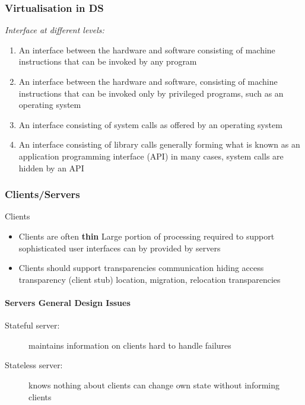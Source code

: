 \subsubsection{Virtualisation in DS}
\textit{Interface at different levels:}
\begin{enumerate}
	\item An interface between the hardware and software consisting of machine instructions
	\subitem that can be invoked by any program
	\item An interface between the hardware and software, consisting of machine instructions
	\subitem that can be invoked only by privileged programs, such as an operating system
	\item An interface consisting of system calls as offered by an operating system
	\item An interface consisting of library calls
	\subitem generally forming what is known as an application programming interface (API)
	\subitem in many cases, system calls are hidden by an API
\end{enumerate}

\subsubsection{Clients/Servers}
\begin{note}{Clients}
	\begin{itemize}
		\item Clients are often \textbf{thin}
		\subitem Large portion of processing required to support sophisticated user interfaces can by provided by servers	
		\item Clients should support transparencies
		\subitem communication hiding
		\subitem access transparency (client stub)
		\subitem location, migration, relocation transparencies
	\end{itemize}
\end{note}

\paragraph{Servers General Design Issues}
\begin{description}
	\item[Stateful server:] maintains information on clients
	\subitem hard to handle failures
	\item[Stateless server:] knows nothing about clients
	\subitem can change own state without informing clients
\end{description}
